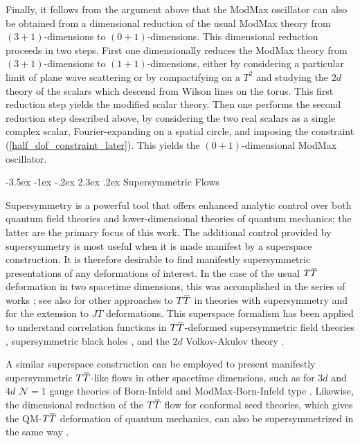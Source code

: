 \documentclass[12pt]{article}
\makeatletter
\numberwithin{equation}{section}
\renewcommand\section{\@startsection {section}{1}{\z@}%
                                   {-3.5ex \@plus -1ex \@minus -.2ex}%
                                   {2.3ex \@plus.2ex}%
                                   {\normalfont\large\bfseries}}
\newcommand{\overbar}[1]{\mkern 1.5mu\overline{\mkern-1.5mu#1\mkern-1.5mu}\mkern 1.5mu}
\def\TT{{T\overbar{T}}}
\makeatother
\begin{document}
Finally, it follows from the argument above that the ModMax oscillator can also be obtained from a dimensional reduction of the usual ModMax theory from $(3+1)$-dimensions to $(0+1)$-dimensions. This dimensional reduction proceeds in two steps. First one dimensionally reduces the ModMax theory from $(3+1)$-dimensions to $(1+1)$-dimensions, either by considering a particular limit of plane wave scattering \cite{Conti:2022egv} or by compactifying on a $T^2$ and studying the $2d$ theory of the scalars which descend from Wilson lines on the torus. This first reduction step yields the modified scalar theory. Then one performs the second reduction step described above, by considering the two real scalars as a single complex scalar, Fourier-expanding on a spatial circle, and imposing the constraint (\ref{half_dof_constraint_later}). This yields the $(0+1)$-dimensional ModMax oscillator.

\section{Supersymmetric Flows}\label{sec:SUSY}

Supersymmetry is a powerful tool that offers enhanced analytic control over both quantum field theories and lower-dimensional theories of quantum mechanics; the latter are the primary focus of this work. The additional control provided by supersymmetry is most useful when it is made manifest by a superspace construction. It is therefore desirable to find manifestly supersymmetric presentations of any deformations of interest. In the case of the usual $\TT$ deformation in two spacetime dimensions, this was accomplished in the series of works \cite{Baggio:2018rpv,Chang:2018dge,Jiang:2019hux,Chang:2019kiu,Ferko:2021loo}; see also \cite{Coleman:2019dvf,Lee:2021iut,Lee:2023uxj} for other approaches to $\TT$ in theories with supersymmetry and \cite{Jiang:2019trm} for the extension to $J \overline{T}$ deformations. This superspace formalism has been applied to understand correlation functions in $\TT$-deformed supersymmetric field theories \cite{He:2019ahx,Ebert:2020tuy}, supersymmetric black holes \cite{Manschot:2022lib}, and the $2d$ Volkov-Akulov theory \cite{Cribiori:2019xzp}.

A similar superspace construction can be employed to present manifestly supersymmetric $\TT$-like flows in other spacetime dimensions, such as for $3d$ and $4d$ $\mathcal{N} = 1$ gauge theories of Born-Infeld and ModMax-Born-Infeld type \cite{Ferko:2019oyv,Ferko:2022iru,Ferko:2023sps}. Likewise, the dimensional reduction of the $\TT$ flow for conformal seed theories, which gives the QM-$\TT$ deformation of quantum mechanics, can also be supersymmetrized in the same way \cite{Ebert:2022xfh}.
\end{document}
